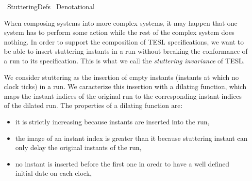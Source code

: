 %
\begin{isabellebody}%
%
%
\isadelimdocument
%
\endisadelimdocument
%
\isatagdocument
%
\isamarkuptrue%
%
\isamarkuptrue%
%
\endisatagdocument
{\isafolddocument}%
%
\isadelimdocument
%
\endisadelimdocument
%
\isadelimtheory
%
\endisadelimtheory
%
\isatagtheory
{}\isamarkupfalse%
\ StutteringDefs\isanewline
\isanewline
{}\ Denotational\isanewline
\isanewline
{}%
\endisatagtheory
{\isafoldtheory}%
%
\isadelimtheory
%
\endisadelimtheory
%
\begin{isamarkuptext}%
When composing systems into more complex systems, it may happen that one system 
  has to perform some action while the rest of the complex system does nothing.
  In order to support the composition of TESL specifications, we want to be able 
  to insert stuttering instants in a run without breaking the conformance of a run 
  to its specification. This is what we call the \emph{stuttering invariance} of TESL.%
\end{isamarkuptext}\isamarkuptrue%
%
\isadelimdocument
%
\endisadelimdocument
%
\isatagdocument
%
\isamarkuptrue%
%
\endisatagdocument
{\isafolddocument}%
%
\isadelimdocument
%
\endisadelimdocument
%
\begin{isamarkuptext}%
We consider stuttering as the insertion of empty instants (instants at which no 
clock ticks) in a run. We caracterize this insertion with a dilating function,
which maps the instant indices of the original run to the corresponding instant
indices of the dilated run.
The properties of a dilating function are:

%
\begin{itemize}%
\item it is strictly increasing because instants are inserted into the run,

\item the image of an instant index is greater than it because stuttering instant 
can only delay the original instants of the run, 

\item no instant is inserted before the first one in oredr to have a well defined 
initial date on each clock,


\end{itemize}
\end{isamarkuptext}
\end{isabellebody}
